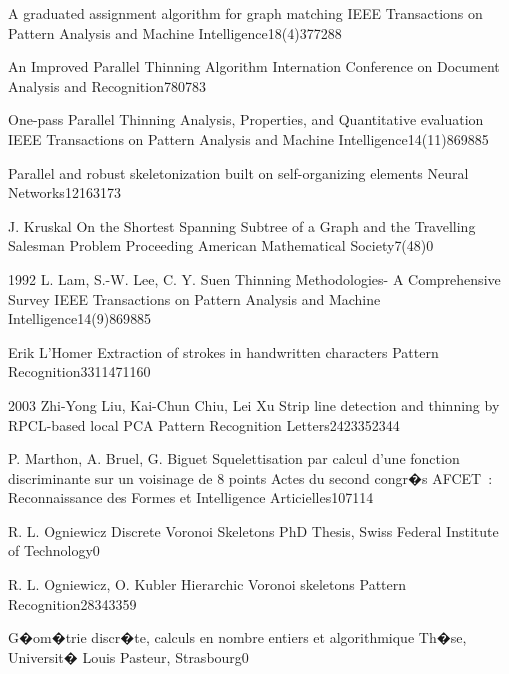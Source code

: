 {A graduated assignment algorithm for graph matching}
{IEEE Transactions on Pattern Analysis and Machine Intelligence}{18(4)}{377}{288}

{An Improved Parallel Thinning Algorithm}
{Internation Conference on Document Analysis and Recognition}{}{780}{783}

{One-pass Parallel Thinning Analysis, Properties, and Quantitative evaluation}
{IEEE Transactions on Pattern Analysis and Machine Intelligence}{14(11)}{869}{885}

{Parallel and robust skeletonization built on self-organizing elements}
{Neural Networks}{12}{163}{173}

 {J. Kruskal}
{On the Shortest Spanning Subtree of a Graph and the Travelling Salesman Problem}
{Proceeding American Mathematical Society}{7(48)}{0}{}

 {1992} {L. Lam, S.-W. Lee, C. Y. Suen}
{Thinning Methodologies- A Comprehensive Survey}
{IEEE Transactions on Pattern Analysis and Machine Intelligence}{14(9)}{869}{885}

 { Erik L'Homer}
{Extraction of strokes in handwritten characters}
{Pattern Recognition}{33}{1147}{1160}

 {2003} {Zhi-Yong Liu, Kai-Chun Chiu, Lei Xu}
{Strip line detection and thinning by RPCL-based local PCA}
{Pattern Recognition Letters}{24}{2335}{2344}

 {P. Marthon, A. Bruel, G. Biguet}
{Squelettisation par calcul d'une fonction discriminante sur un voisinage de 8 points}
{Actes du second congr�s AFCET~: Reconnaissance des Formes et Intelligence Articielles}{107}{114}

 {R. L. Ogniewicz}
{Discrete Voronoi Skeletons}
{PhD Thesis, Swiss Federal Institute of Technology}{}{0}{}

 {R. L. Ogniewicz, O. Kubler}
{Hierarchic Voronoi skeletons}
{Pattern Recognition}{28}{343}{359}

{G�om�trie discr�te, calculs en nombre entiers et algorithmique}
{Th�se, Universit� Louis Pasteur, Strasbourg}{}{0}{}

